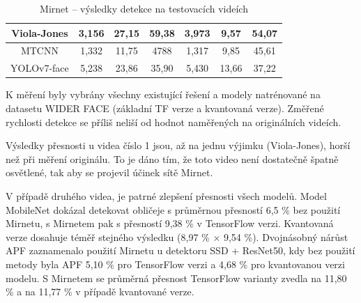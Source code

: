 \begin{table}[H]
\begin{tabular}{c|ccc|ccc|}
  \multicolumn{1}{|c|}{\cellcolor[HTML]{E0DBDB}Viola-Jones}                  & \multicolumn{1}{c|}{3,156}                                  & \multicolumn{1}{c|}{27,15}                                  & 59,38          & \multicolumn{1}{c|}{3,973}                                  & \multicolumn{1}{c|}{9,57}                                   & 54,07          \\ \hline
  \multicolumn{1}{|c|}{\cellcolor[HTML]{E0DBDB}MTCNN}                        & \multicolumn{1}{c|}{1,332}                                  & \multicolumn{1}{c|}{11,75}                                  & 4788           & \multicolumn{1}{c|}{1,317}                                  & \multicolumn{1}{c|}{9,85}                                   & 45,61          \\ \hline
  \multicolumn{1}{|c|}{\cellcolor[HTML]{E0DBDB}YOLOv7-face}                  & \multicolumn{1}{c|}{5,238}                                  & \multicolumn{1}{c|}{23,86}                                  & 35,90          & \multicolumn{1}{c|}{5,430}                                  & \multicolumn{1}{c|}{13,66}                                  & 37,22          \\ \hline
  \end{tabular}
  \label{tabulka:mirnet}
  \caption{Mirnet -- výsledky detekce na testovacích videích}
\end{table}


K měření byly vybrány všechny existující řešení a modely natrénované na datasetu WIDER FACE (základní TF verze a kvantovaná verze). Změřené rychlosti detekce se příliš neliší od hodnot naměřených na originálních videích. 

Výsledky přesnosti u videa číslo 1 jsou, až na jednu výjimku (Viola-Jones), horší než při měření originálu. To je dáno tím, že toto video není dostatečně špatně osvětlené, tak aby se projevil účinek sítě Mirnet. 

V případě druhého videa, je patrné zlepšení přesnosti všech modelů. Model MobileNet dokázal detekovat obličeje s průměrnou přesností 6,5 \% bez použití Mirnetu, s Mirnetem pak s přesností 9,38 \% v TensorFlow verzi. Kvantovaná verze dosahuje téměř stejného výsledku (8,97 \% $\times$ 9,54 \%). Dvojnásobný nárůst APF zaznamenalo použití Mirnetu u detektoru SSD + ResNet50, kdy bez použití metody byla APF 5,10 \% pro TensorFlow verzi a 4,68 \% pro kvantovanou verzi modelu. S Mirnetem se průměrná přesnost TensorFlow varianty zvedla na 11,80 \% a na 11,77 \% v případě kvantované verze.

